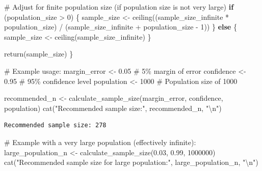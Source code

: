 \documentclass[
  letterpaper,
  DIV=11,
  numbers=noendperiod]{scrreprt}
\newenvironment{Shaded}{\begin{snugshade}}{\end{snugshade}}
\newcommand{\CommentTok}[1]{\textcolor[rgb]{0.37,0.37,0.37}{#1}}
\newcommand{\ControlFlowTok}[1]{\textcolor[rgb]{0.00,0.23,0.31}{\textbf{#1}}}
\newcommand{\DecValTok}[1]{\textcolor[rgb]{0.68,0.00,0.00}{#1}}
\newcommand{\FloatTok}[1]{\textcolor[rgb]{0.68,0.00,0.00}{#1}}
\newcommand{\FunctionTok}[1]{\textcolor[rgb]{0.28,0.35,0.67}{#1}}
\newcommand{\NormalTok}[1]{\textcolor[rgb]{0.00,0.23,0.31}{#1}}
\newcommand{\OtherTok}[1]{\textcolor[rgb]{0.00,0.23,0.31}{#1}}
\newcommand{\SpecialCharTok}[1]{\textcolor[rgb]{0.37,0.37,0.37}{#1}}
\newcommand{\StringTok}[1]{\textcolor[rgb]{0.13,0.47,0.30}{#1}}
\begin{document}
\begin{Shaded}
\begin{Highlighting}[]
  \CommentTok{\# Adjust for finite population size (if population size is not very large)}
  \ControlFlowTok{if}\NormalTok{ (population\_size }\SpecialCharTok{\textgreater{}} \DecValTok{0}\NormalTok{) \{}
\NormalTok{    sample\_size }\OtherTok{\textless{}{-}} \FunctionTok{ceiling}\NormalTok{((sample\_size\_infinite }\SpecialCharTok{*}\NormalTok{ population\_size) }\SpecialCharTok{/}
\NormalTok{                              (sample\_size\_infinite }\SpecialCharTok{+}\NormalTok{ population\_size }\SpecialCharTok{{-}} \DecValTok{1}\NormalTok{))}
\NormalTok{  \} }\ControlFlowTok{else}\NormalTok{ \{}
\NormalTok{    sample\_size }\OtherTok{\textless{}{-}} \FunctionTok{ceiling}\NormalTok{(sample\_size\_infinite)}
\NormalTok{  \}}

  \FunctionTok{return}\NormalTok{(sample\_size)}
\NormalTok{\}}

\CommentTok{\# Example usage:}
\NormalTok{margin\_error }\OtherTok{\textless{}{-}} \FloatTok{0.05} \CommentTok{\# 5\% margin of error}
\NormalTok{confidence }\OtherTok{\textless{}{-}} \FloatTok{0.95} \CommentTok{\# 95\% confidence level}
\NormalTok{population }\OtherTok{\textless{}{-}} \DecValTok{1000} \CommentTok{\# Population size of 1000}

\NormalTok{recommended\_n }\OtherTok{\textless{}{-}} \FunctionTok{calculate\_sample\_size}\NormalTok{(margin\_error, confidence, population)}
\FunctionTok{cat}\NormalTok{(}\StringTok{"Recommended sample size:"}\NormalTok{, recommended\_n, }\StringTok{"}\SpecialCharTok{\textbackslash{}n}\StringTok{"}\NormalTok{)}
\end{Highlighting}
\end{Shaded}

\begin{verbatim}
Recommended sample size: 278 
\end{verbatim}

\begin{Shaded}
\begin{Highlighting}[]
\CommentTok{\# Example with a very large population (effectively infinite):}
\NormalTok{large\_population\_n }\OtherTok{\textless{}{-}} \FunctionTok{calculate\_sample\_size}\NormalTok{(}\FloatTok{0.03}\NormalTok{, }\FloatTok{0.99}\NormalTok{, }\DecValTok{1000000}\NormalTok{)}
\FunctionTok{cat}\NormalTok{(}\StringTok{"Recommended sample size for large population:"}\NormalTok{, large\_population\_n, }\StringTok{"}\SpecialCharTok{\textbackslash{}n}\StringTok{"}\NormalTok{)}
\end{Highlighting}
\end{Shaded}
\end{document}
